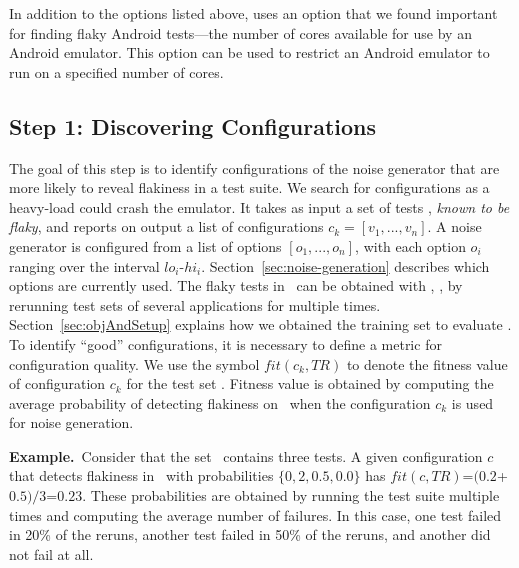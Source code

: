 \documentclass[conference]{IEEEtran}
\begin{document}
In addition to the options listed above, \tname{} uses an option that we found important for finding flaky Android tests---the number of cores available for use by an Android emulator. This option can be used to restrict an Android emulator to run on a specified number of cores. 






\subsection{Step 1: Discovering Configurations}
\label{technique:discovering-configurations}

The goal of this step is to identify configurations of the noise generator that are more likely to reveal flakiness in a test suite. We search for configurations as a heavy-load could crash the emulator. It takes as input a set of tests \tr, \emph{known to be flaky}, and reports on output a list of configurations $c_k=[v_1,..., v_n]$. A noise generator is configured from a list of options $[o_1,...,o_n]$, with each option $o_i$ ranging over the interval $lo_i$-$hi_i$. Section~\ref{sec:noise-generation} describes which options are currently used. The flaky tests in \tr\ can be obtained with \rerun{}, \ie{}, by rerunning test sets of several applications for multiple times. Section~\ref{sec:objAndSetup} explains how we obtained the training set to evaluate \tname. To identify ``good'' configurations, it is necessary to define a metric for configuration quality. We use the symbol $\mathit{fit(c_k, \mathit{TR})}$ to denote the fitness value of configuration $c_k$ for the test set \tr. Fitness value is obtained by computing the average probability of detecting flakiness on \tr\ when the configuration $c_k$ is used for noise generation. 

\vspace{1ex}\noindent\textbf{Example.}~Consider that the set \tr\ contains three tests. A given configuration $c$ that detects flakiness in \tr\ with probabilities $\{0,2, 0.5, 0.0\}$ has $\mathit{fit}(c, \mathit{TR})$=$(0.2$+$0.5)/3$=$0.23$. These probabilities are obtained by running the test suite multiple times and computing the average number of failures. In this case, one test failed in 20\% of the reruns, another test failed in 50\% of the reruns, and another did not fail at all.
\end{document}
